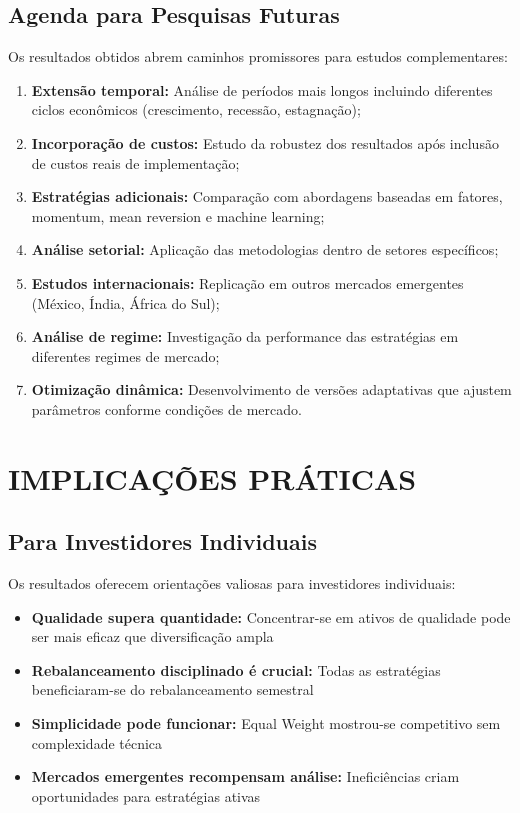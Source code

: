 \subsection{Agenda para Pesquisas Futuras}

Os resultados obtidos abrem caminhos promissores para estudos complementares:

\begin{enumerate}
    \item \textbf{Extensão temporal:} Análise de períodos mais longos incluindo diferentes ciclos econômicos (crescimento, recessão, estagnação);
    
    \item \textbf{Incorporação de custos:} Estudo da robustez dos resultados após inclusão de custos reais de implementação;
    
    \item \textbf{Estratégias adicionais:} Comparação com abordagens baseadas em fatores, momentum, mean reversion e machine learning;
    
    \item \textbf{Análise setorial:} Aplicação das metodologias dentro de setores específicos;
    
    \item \textbf{Estudos internacionais:} Replicação em outros mercados emergentes (México, Índia, África do Sul);
    
    \item \textbf{Análise de regime:} Investigação da performance das estratégias em diferentes regimes de mercado;
    
    \item \textbf{Otimização dinâmica:} Desenvolvimento de versões adaptativas que ajustem parâmetros conforme condições de mercado.
\end{enumerate}

\section{IMPLICAÇÕES PRÁTICAS}

\subsection{Para Investidores Individuais}

Os resultados oferecem orientações valiosas para investidores individuais:

\begin{itemize}
    \item \textbf{Qualidade supera quantidade:} Concentrar-se em ativos de qualidade pode ser mais eficaz que diversificação ampla
    \item \textbf{Rebalanceamento disciplinado é crucial:} Todas as estratégias beneficiaram-se do rebalanceamento semestral
    \item \textbf{Simplicidade pode funcionar:} Equal Weight mostrou-se competitivo sem complexidade técnica
    \item \textbf{Mercados emergentes recompensam análise:} Ineficiências criam oportunidades para estratégias ativas
\end{itemize}

